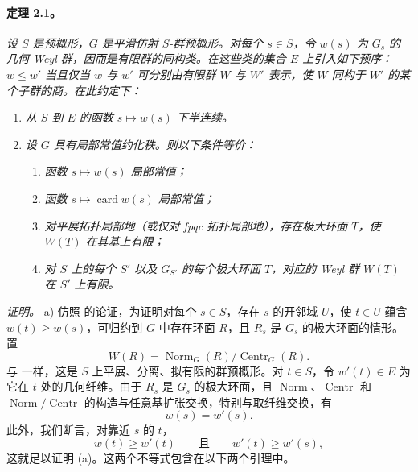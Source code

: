 \paragraph{\textbf{定理 2.1。}}
\emph{设 \(S\) 是预概形，\(G\) 是平滑仿射 \(S\)-群预概形。对每个 \(s\in S\)，令 \(w(s)\) 为 \(G_s\) 的几何 Weyl 群，因而是有限群的同构类。在这些类的集合 \(E\) 上引入如下预序：\(w\leq w'\) 当且仅当 \(w\) 与 \(w'\) 可分别由有限群 \(W\) 与 \(W'\) 表示，使 \(W\) 同构于 \(W'\) 的某个子群的商。在此约定下：}
\begin{enumerate}
\renewcommand{\labelenumi}{\alph{enumi})}
\item{} \emph{从 \(S\) 到 \(E\) 的函数 \(s\mapsto w(s)\) 下半连续。}
\item{} \emph{设 \(G\) 具有局部常值约化秩。则以下条件等价：}
\begin{enumerate}
\renewcommand{\labelenumii}{(\roman{enumii})}
\item \emph{函数 \(s\mapsto w(s)\) 局部常值；}
\item[\textup{(i bis)}] \emph{函数 \(s\mapsto\operatorname{card}w(s)\) 局部常值；}
\item \emph{对平展拓扑局部地（或仅对 fpqc 拓扑局部地），存在极大环面 \(T\)，使 \(W(T)\) 在其基上有限；}
\item[\textup{(ii bis)}] \emph{对 \(S\) 上的每个 \(S'\) 以及 \(G_{S'}\) 的每个极大环面 \(T\)，对应的 Weyl 群 \(W(T)\) 在 \(S'\) 上有限。}
\end{enumerate}
\end{enumerate}
\emph{证明。}
a) 仿照  的论证，为证明对每个 \(s\in S\)，存在 \(s\) 的开邻域 \(U\)，使 \(t\in U\) 蕴含 \(w(t)\geq w(s)\)，可归约到 \(G\) 中存在环面 \(R\)，且 \(R_s\) 是 \(G_s\) 的极大环面的情形。置
\[
  W(R)=\operatorname{Norm}_G(R)/\operatorname{Centr}_G(R).
\]
与  一样，这是 \(S\) 上平展、分离、拟有限的群预概形。对 \(t\in S\)，令 \(w'(t)\in E\) 为它在 \(t\) 处的几何纤维。由于 \(R_s\) 是 \(G_s\) 的极大环面，且 \(\operatorname{Norm}\)、\(\operatorname{Centr}\) 和 \(\operatorname{Norm}/\operatorname{Centr}\) 的构造与任意基扩张交换，特别与取纤维交换，有
\[
  w(s)=w'(s).
\]
此外，我们断言，对靠近 \(s\) 的 \(t\)，
\[
  w(t)\geq w'(t)
  \qquad\text{且}\qquad
  w'(t)\geq w'(s),
\]
这就足以证明 (a)。这两个不等式包含在以下两个引理中。
